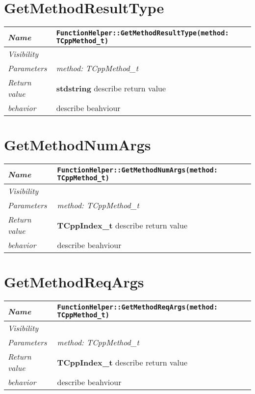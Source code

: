  \section{GetMethodResultType}
\begin{longtable}{p{3cm} @{\hskip 1cm} p{12cm}}
 \hline
\textit{Name} & \texttt{FunctionHelper::GetMethodResultType(method: TCppMethod_t)}\\
\hline
 \textit{Visibility} & \\
\hline
\textit{Parameters} & \textit{method: TCppMethod_t}\\
\hline
\textit{Return value} & \textbf{ stdstring} describe return value\\
  \hline
 \textit{behavior} & describe beahviour \\
\hline
\end{longtable} \pagebreak
 \section{GetMethodNumArgs}
\begin{longtable}{p{3cm} @{\hskip 1cm} p{12cm}}
 \hline
\textit{Name} & \texttt{FunctionHelper::GetMethodNumArgs(method: TCppMethod_t)}\\
\hline
 \textit{Visibility} & \\
\hline
\textit{Parameters} & \textit{method: TCppMethod_t}\\
\hline
\textit{Return value} & \textbf{ TCppIndex_t} describe return value\\
  \hline
 \textit{behavior} & describe beahviour \\
\hline
\end{longtable} \pagebreak
 \section{GetMethodReqArgs}
\begin{longtable}{p{3cm} @{\hskip 1cm} p{12cm}}
 \hline
\textit{Name} & \texttt{FunctionHelper::GetMethodReqArgs(method: TCppMethod_t)}\\
\hline
 \textit{Visibility} & \\
\hline
\textit{Parameters} & \textit{method: TCppMethod_t}\\
\hline
\textit{Return value} & \textbf{ TCppIndex_t} describe return value\\
  \hline
 \textit{behavior} & describe beahviour \\
\hline
\end{longtable} \pagebreak
